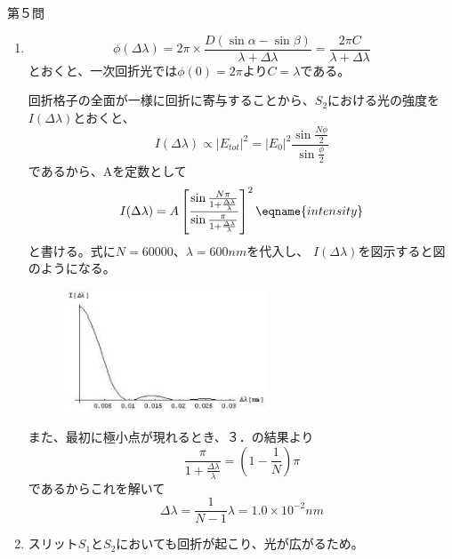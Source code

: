 \documentclass[fleqn]{jbook}
\begin{document}
\begin{answer}{第５問}{}
\begin{enumerate}

\item

\begin{equation}
\phi (\Delta \lambda)=2\pi 
\times \frac{D(\sin \alpha - \sin \beta)}{\lambda +\Delta \lambda} 
=\frac{2\pi C}{\lambda +\Delta \lambda}
\end{equation}
とおくと、一次回折光では$\phi (0)=2\pi$より$C=\lambda$である。

回折格子の全面が一様に回折に寄与することから、$S_2$における光の強度を
$I(\Delta \lambda)$とおくと、
\begin{equation}
I(\Delta \lambda)\propto |E_{tot}|^2=|E_0|^2 
\frac{\sin \frac{N\phi}{2}}{\sin \frac{\phi}{2}}
\end{equation}
であるから、Aを定数として
\begin{equation}
I(\Delta \lambda)=A\left[\frac{\sin \frac{N\pi}{1+\frac{\Delta \lambda}{\lambda}}}{\sin \frac{\pi}{1+\frac{\Delta \lambda}{\lambda}}}\right]^2
\eqname{intensity}
\end{equation}
と書ける。式に$N=60000、\lambda =600nm$を代入し、
$I(\Delta \lambda)$を図示すると図のようになる。

\begin{figure}[htpb]
\begin{center}
\includegraphics[width=6.0cm,clip]{2004phy5-2.eps}
\caption{}
\end{center}
\end{figure}


また、最初に極小点が現れるとき、３．の結果より
\begin{equation}
\frac{\pi}{1+\frac{\Delta \lambda}{\lambda}}=(1-\frac{1}{N})\pi
\end{equation}
であるからこれを解いて
\begin{equation}
\Delta \lambda =\frac{1}{N-1}\lambda =1.0 \times 10^{-2} nm
\end{equation}

\item 

スリット$S_1$と$S_2$においても回折が起こり、光が広がるため。


\end{enumerate}
\end{answer}
\end{document}
